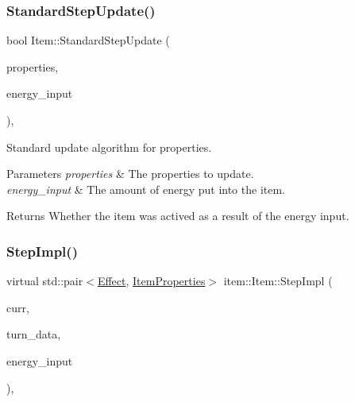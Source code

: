 \subsubsection{\texorpdfstring{Standard\+Step\+Update()}{StandardStepUpdate()}}
{\footnotesize\ttfamily bool Item\+::\+Standard\+Step\+Update (\begin{DoxyParamCaption}\item[{\hyperlink{classitem_1_1_item_properties}{Item\+Properties} \&}]{properties,  }\item[{int}]{energy\+\_\+input }\end{DoxyParamCaption})\hspace{0.3cm}{\ttfamily [static]}, {\ttfamily [protected]}}



Standard update algorithm for properties. 


\begin{DoxyParams}{Parameters}
{\em properties} & The properties to update. \\
\hline
{\em energy\+\_\+input} & The amount of energy put into the item. \\
\hline
\end{DoxyParams}
\begin{DoxyReturn}{Returns}
Whether the item was actived as a result of the energy input. 
\end{DoxyReturn}
\mbox{\label{classitem_1_1_item_a90df61c8a2a20144eb1100af5fb2d464}} 
\subsubsection{\texorpdfstring{Step\+Impl()}{StepImpl()}}
{\footnotesize\ttfamily virtual std\+::pair$<$\hyperlink{classitem_1_1_effect}{Effect}, \hyperlink{classitem_1_1_item_properties}{Item\+Properties}$>$ item\+::\+Item\+::\+Step\+Impl (\begin{DoxyParamCaption}\item[{\hyperlink{classtimeplane_1_1_moment}{Moment}}]{curr,  }\item[{\hyperlink{classroundinfo_1_1_round_info_view}{Round\+Info\+View} const \&}]{turn\+\_\+data,  }\item[{int}]{energy\+\_\+input }\end{DoxyParamCaption})\hspace{0.3cm}{\ttfamily [protected]}, {}}



